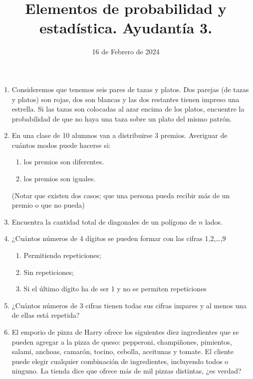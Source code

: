 \documentclass{article}
\title{Elementos de probabilidad y estadística. Ayudantía 3.}
\date{16 de Febrero de 2024}
\begin{document}
\maketitle

\begin{enumerate}
    \item Consideremos que tenemos seis pares de tazas y platos. Dos parejas (de tazas y platos) son rojas, dos son blancas y las dos restantes tienen impreso una estrella. Si las tazas son colocadas al azar encima de los platos, encuentre la probabilidad de que no haya una taza sobre un plato del mismo patrón.
    \item En una clase de 10 alumnos van a distribuirse 3 premios. Averiguar de cuántos modos
    puede hacerse si:

    \begin{enumerate}
        \item los premios son diferentes.
        \item los premios son iguales.
    \end{enumerate}

    (Notar que existen dos casos; que una persona pueda recibir más de un premio o que no pueda)

    \item Encuentra la cantidad total de diagonales de un polígono de $n$ lados.
    
    \item ¿Cuántos números de 4 dígitos se pueden formar con las cifras 1,2,\dots,9
    
    \begin{enumerate}
        \item Permitiendo repeticiones;
        \item Sin repeticiones;
        \item Si el último dígito ha de ser 1 y no se permiten repeticiones
    \end{enumerate}


    \item ¿Cuántos números de 3 cifras tienen todas sus cifras impares y al menos una de ellas está repetida?
    
    \item El emporio de pizza de Harry ofrece los siguientes diez ingredientes que se pueden agregar a la pizza de queso: pepperoni, champiñones, pimientos, salami, anchoas, camarón, tocino, cebolla, aceitunas y tomate. El cliente puede elegir cualquier combinación de ingredientes, incluyendo todos o ninguno. La tienda dice que ofrece más de mil pizzas distintas, ¿es verdad?
    
    
\end{enumerate}
\end{document}
